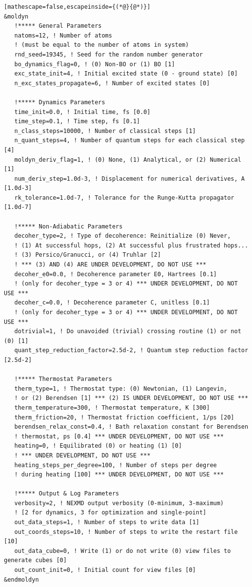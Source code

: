 \documentclass[letterpaper,12pt,titlepage]{article}
\begin{document}
\begin{appendix}
\begin{lstlisting}[mathescape=false,escapeinside={(*@}{@*)}]
&moldyn
   !***** General Parameters
   natoms=12, ! Number of atoms 
   ! (must be equal to the number of atoms in system)
   rnd_seed=19345, ! Seed for the random number generator
   bo_dynamics_flag=0, ! (0) Non-BO or (1) BO [1]
   exc_state_init=4, ! Initial excited state (0 - ground state) [0]
   n_exc_states_propagate=6, ! Number of excited states [0]

   !***** Dynamics Parameters
   time_init=0.0, ! Initial time, fs [0.0]
   time_step=0.1, ! Time step, fs [0.1]
   n_class_steps=10000, ! Number of classical steps [1]
   n_quant_steps=4, ! Number of quantum steps for each classical step [4]
   moldyn_deriv_flag=1, ! (0) None, (1) Analytical, or (2) Numerical [1]
   num_deriv_step=1.0d-3, ! Displacement for numerical derivatives, A [1.0d-3]
   rk_tolerance=1.0d-7, ! Tolerance for the Runge-Kutta propagator [1.0d-7]

   !***** Non-Adiabatic Parameters
   decoher_type=2, ! Type of decoherence: Reinitialize (0) Never, 
   ! (1) At successful hops, (2) At successful plus frustrated hops... 
   ! (3) Persico/Granucci, or (4) Truhlar [2]
   ! *** (3) AND (4) ARE UNDER DEVELOPMENT, DO NOT USE ***
   decoher_e0=0.0, ! Decoherence parameter E0, Hartrees [0.1]
   ! (only for decoher_type = 3 or 4) *** UNDER DEVELOPMENT, DO NOT USE ***
   decoher_c=0.0, ! Decoherence parameter C, unitless [0.1]
   ! (only for decoher_type = 3 or 4) *** UNDER DEVELOPMENT, DO NOT USE ***
   dotrivial=1, ! Do unavoided (trivial) crossing routine (1) or not (0) [1]
   quant_step_reduction_factor=2.5d-2, ! Quantum step reduction factor [2.5d-2]

   !***** Thermostat Parameters
   therm_type=1, ! Thermostat type: (0) Newtonian, (1) Langevin, 
   ! or (2) Berendsen [1] *** (2) IS UNDER DEVELOPMENT, DO NOT USE ***
   therm_temperature=300, ! Thermostat temperature, K [300]
   therm_friction=20, ! Thermostat friction coefficient, 1/ps [20]
   berendsen_relax_const=0.4, ! Bath relaxation constant for Berendsen 
   ! thermostat, ps [0.4] *** UNDER DEVELOPMENT, DO NOT USE ***
   heating=0, ! Equilibrated (0) or heating (1) [0]
   ! *** UNDER DEVELOPMENT, DO NOT USE ***
   heating_steps_per_degree=100, ! Number of steps per degree
   ! during heating [100] *** UNDER DEVELOPMENT, DO NOT USE ***

   !***** Output & Log Parameters
   verbosity=2, ! NEXMD output verbosity (0-minimum, 3-maximum)
   ! [2 for dynamics, 3 for optimization and single-point]
   out_data_steps=1, ! Number of steps to write data [1]
   out_coords_steps=10, ! Number of steps to write the restart file [10]
   out_data_cube=0, ! Write (1) or do not write (0) view files to generate cubes [0]
   out_count_init=0, ! Initial count for view files [0]
&endmoldyn


\end{lstlisting}
\end{appendix}
\end{document}
